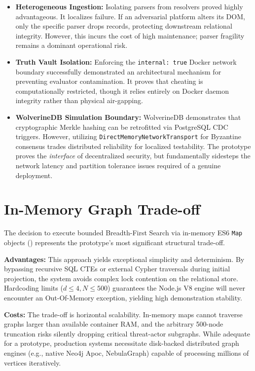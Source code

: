 \begin{itemize}
    \item \textbf{Heterogeneous Ingestion:} Isolating parsers from resolvers proved highly advantageous. It localizes failure. If an adversarial platform alters its DOM, only the specific parser drops records, protecting downstream relational integrity. However, this incurs the cost of high maintenance; parser fragility remains a dominant operational risk.
    \item \textbf{Truth Vault Isolation:} Enforcing the \texttt{internal: true} Docker network boundary successfully demonstrated an architectural mechanism for preventing evaluator contamination. It proves that cheating is computationally restricted, though it relies entirely on Docker daemon integrity rather than physical air-gapping.
    \item \textbf{WolverineDB Simulation Boundary:} WolverineDB demonstrates that cryptographic Merkle hashing can be retrofitted via PostgreSQL CDC triggers. However, utilizing \texttt{DirectMemoryNetworkTransport} for Byzantine consensus trades distributed reliability for localized testability. The prototype proves the \textit{interface} of decentralized security, but fundamentally sidesteps the network latency and partition tolerance issues required of a genuine deployment.
\end{itemize}

\section{In-Memory Graph Trade-off}
\label{sec:disc-graph-tradeoff}
The decision to execute bounded Breadth-First Search via in-memory ES6 \texttt{Map} objects () represents the prototype's most significant structural trade-off.

\textbf{Advantages:} This approach yields exceptional simplicity and determinism. By bypassing recursive SQL CTEs or external Cypher traversals during initial projection, the system avoids complex lock contention on the relational store. Hardcoding limits ($d \le 4, N \le 500$) guarantees the Node.js V8 engine will never encounter an Out-Of-Memory exception, yielding high demonstration stability.

\textbf{Costs:} The trade-off is horizontal scalability. In-memory maps cannot traverse graphs larger than available container RAM, and the arbitrary 500-node truncation risks silently dropping critical threat-actor subgraphs. While adequate for a prototype, production systems necessitate disk-backed distributed graph engines (e.g., native Neo4j Apoc, NebulaGraph) capable of processing millions of vertices iteratively.


